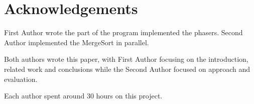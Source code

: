 \documentclass[runningheads]{llncs}
\begin{document}
\section*{Acknowledgements}

First Author wrote the part of the program implemented the phasers. Second Author implemented the MergeSort in parallel. 

Both authors wrote this paper, with First Author focusing on the introduction, related work and conclusions while the Second Author focused on approach and evaluation.

Each author spent around 30 hours on this project.



\end{document}
